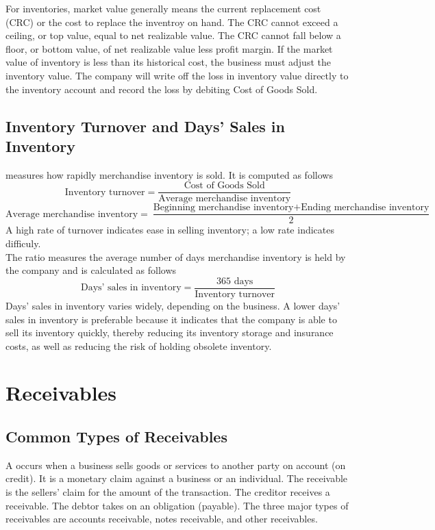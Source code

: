\documentclass{article}
\begin{document}
For inventories, market value generally means the current replacement cost (CRC) or the cost to replace the inventroy on hand. The CRC cannot exceed a ceiling, or top value, equal to net realizable value. The CRC cannot fall below a floor, or bottom value, of net realizable value less profit margin. If the market value of inventory is less than its historical cost, the business must adjust the inventory value. The company will write off the loss in inventory value directly to the inventory account and record the loss by debiting Cost of Goods Sold. 

\subsection{Inventory Turnover and Days' Sales in Inventory}

 measures how rapidly merchandise inventory is sold. It is computed as follows $$\textrm{Inventory turnover} = \frac{\textrm{Cost of Goods Sold}}{\textrm{Average merchandise inventory}}$$ $$\textrm{Average merchandise inventory} = \frac{\textrm{Beginning merchandise inventory} + \textrm{Ending merchandise inventory}}{2}$$ A high rate of turnover indicates ease in selling inventory; a low rate indicates difficuly. \\ 

The  ratio measures the average number of days merchandise inventory is held by the company and is calculated as follows $$\textrm{Days' sales in inventory} = \frac{\textrm{365 days}}{\textrm{Inventory turnover}}$$ Days' sales in inventory varies widely, depending on the business. A lower days' sales in inventory is preferable because it indicates that the company is able to sell its inventory quickly, thereby reducing its inventory storage and insurance costs, as well as reducing the risk of holding obsolete inventory. 

\section{Receivables}

\subsection{Common Types of Receivables}

A  occurs when a business sells goods or services to another party on account (on credit). It is a monetary claim against a business or an individual. The receivable is the sellers' claim for the amount of the transaction. The creditor receives a receivable. The debtor takes on an obligation (payable). The three major types of receivables are accounts receivable, notes receivable, and other receivables. \\ 
\end{document}
